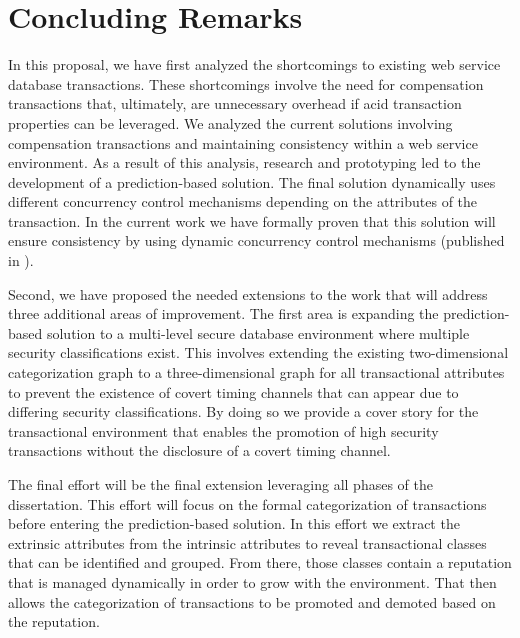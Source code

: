 \section{Concluding Remarks}
\label{conclusion:concluding_remarks}
In this proposal, we have first analyzed the shortcomings to existing web service database transactions. These shortcomings involve the need for compensation transactions that, ultimately, are unnecessary overhead if \gls{acid} transaction properties can be leveraged. We analyzed the current solutions involving compensation transactions and maintaining consistency within a web service environment. As a result of this analysis, research and prototyping led to the development of a prediction-based solution. The final solution dynamically uses different concurrency control mechanisms depending on the attributes of the transaction. In the current work we have formally proven that this solution will ensure consistency by using dynamic concurrency control mechanisms (published in \cite{ravan_ensuring_2020}).

Second, we have proposed the needed extensions to the work that will address three additional areas of improvement. The first area is expanding the prediction-based solution to a multi-level secure database environment where multiple security classifications exist. This involves extending the existing two-dimensional categorization graph to a three-dimensional graph for all transactional attributes to prevent the existence of covert timing channels that can appear due to differing security classifications. By doing so we provide a cover story for the transactional environment that enables the promotion of high security transactions without the disclosure of a covert timing channel.

The final effort will be the final extension leveraging all phases of the dissertation. This effort will focus on the formal categorization of transactions before entering the prediction-based solution. In this effort we extract the extrinsic attributes from the intrinsic attributes to reveal transactional classes that can be identified and grouped. From there, those classes contain a reputation that is managed dynamically in order to grow with the environment. That then allows the categorization of transactions to be promoted and demoted based on the reputation.

